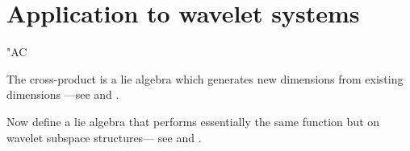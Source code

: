\section{Application to wavelet systems}
\begin{dingautolist}{"AC}
  \item The cross-product is a lie algebra which generates new dimensions from existing dimensions
       ---see  and .

  \item Now define a lie algebra that performs essentially the same function but on 
        wavelet subspace structures---
        see  and .

\end{dingautolist}


